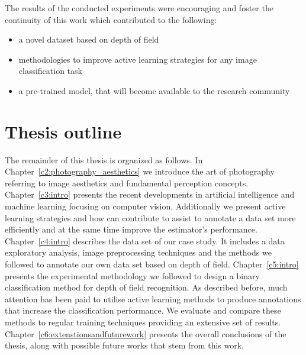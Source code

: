 The results of the conducted experiments were encouraging and foster the continuity of this work which contributed to the following:
\begin{itemize}
 \item a novel dataset based on depth of field
 \item methodologies to improve active learning strategies for any image classification task
 \item a pre-trained model, that will become available to the research community
\end{itemize}


\section{Thesis outline}

The remainder of this thesis is organized as follows.
In Chapter~\ref{c2:photography_aesthetics} we introduce the art of photography referring to image aesthetics and fundamental perception concepts.
Chapter~\ref{c3:intro} presents the recent developments in artificial intelligence and machine learning focusing on computer vision. Additionally we present active learning strategies and how can contribute to assist to annotate a data set more efficiently and at the same time improve the estimator's performance.
Chapter~\ref{c4:intro} describes the data set of our case study. It includes a data exploratory analysis, image preprocessing techniques and the methods we followed to annotate our own data set based on depth of field.
Chapter~\ref{c5:intro} presents the experimental methodology we followed to design a binary classification method for depth of field recognition. As described before, much attention has been paid to utilise active learning methods to produce annotations that increase the classification performance. We evaluate and compare these methods to regular training techniques providing an extensive set of results.
Chapter~\ref{c6:extenstionsandfuturework} presents the overall conclusions of the thesis, along with possible future works that stem from this work.



